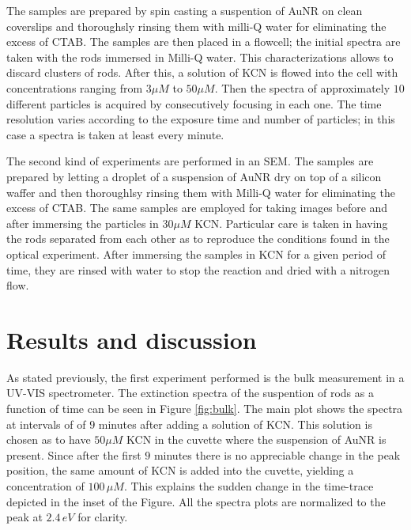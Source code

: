 \documentclass[twocolumn]{article}
\begin{document}
The samples are prepared by spin casting a suspention of AuNR on clean
coverslips and thoroughsly rinsing them  with milli-Q water for eliminating the
excess of CTAB. The samples are then placed in a flowcell; the initial spectra
are taken with the rods immersed in Milli-Q water. This characterizations allows
to discard clusters of rods. After this, a solution of KCN is flowed into the
cell with concentrations ranging from $3\mu M$ to $50\mu M$. Then the spectra of
approximately $10$ different particles is acquired by consecutively focusing in
each one. The time resolution varies according to the exposure time and number
of particles; in this case a spectra is taken at least every minute.

The second kind of experiments are performed in an SEM. The samples are prepared
by letting a droplet of a suspension of AuNR dry on top of a silicon waffer and
then thoroughlsy rinsing them with Milli-Q water for eliminating the excess of
CTAB. The same samples are employed for taking images before and after immersing
the particles in $30\mu M$ KCN. Particular care is taken in having the rods
separated from each other as to reproduce the conditions found in the optical
experiment. After immersing the samples in KCN for a given period of time, they
are rinsed with water to stop the reaction and dried with a nitrogen flow.

\section{Results and discussion}

As stated previously, the first experiment performed is the bulk measurement in a
UV-VIS spectrometer. The extinction spectra of the suspention of rods as a
function of time can be seen in Figure \ref{fig:bulk}. The main plot shows the
spectra at intervals of of $9$ minutes after adding a solution of KCN. This
solution is chosen as to have $50\mu M$ KCN in the cuvette where the suspension
of AuNR is present. Since after the first $9$ minutes there is no appreciable
change in the peak position, the same amount of KCN is added into the cuvette,
yielding a concentration of $100\,\mu M$. This explains the sudden change in the
time-trace depicted in the inset of the Figure. All the spectra plots are
normalized to the peak at $2.4\,eV$ for clarity.
\end{document}
